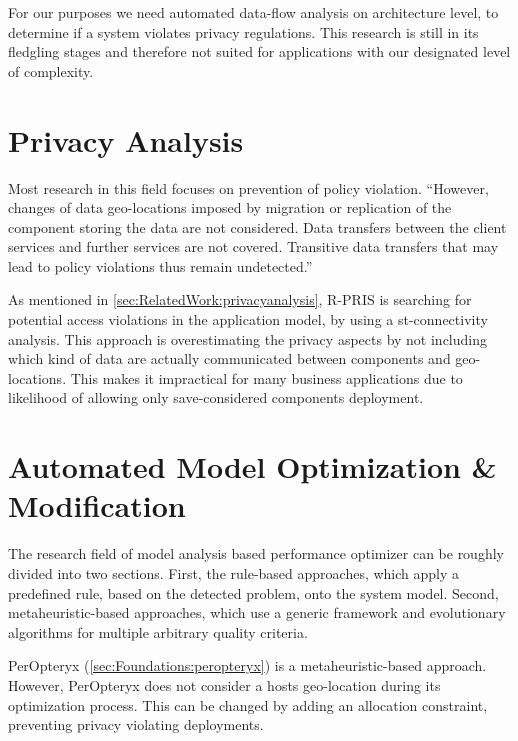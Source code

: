 For our purposes we need automated data-flow analysis on architecture level, to determine if a system violates privacy regulations. This research is still in its fledgling stages and therefore not suited for applications with our designated level of complexity.


\section{Privacy Analysis}
\label{sec:RelatedWork:privacy_check}

Most research in this field focuses on prevention of policy violation. “However, changes of data geo-locations imposed by migration or replication of the component storing the data are not considered. Data transfers between the client services and further services are not covered. Transitive data transfers that may lead to policy violations thus remain undetected.”\cite{Schmieders.2015}

As mentioned in \autoref{sec:RelatedWork:privacyanalysis}, R-PRIS is searching for potential access violations in the application model, by using a st-connectivity analysis.\cite{Schmieders.2015}\cite{Schmieders.} This approach is overestimating the privacy aspects by not including which kind of data are actually communicated between components and geo-locations. This makes it impractical for many business applications due to likelihood of allowing only save-considered components deployment.



\section{Automated Model Optimization \& Modification}
\label{sec:RelatedWork:auto_model_opt}

The research field of model analysis based performance optimizer can be roughly divided into two sections. First, the rule-based approaches, which apply a predefined rule, based on the detected problem, onto the system model. Second, metaheuristic-based approaches, which use a generic framework and evolutionary algorithms for multiple arbitrary quality criteria.\cite{Martens.2010}

PerOpteryx (\autoref{sec:Foundations:peropteryx}) is a metaheuristic-based approach. However, PerOpteryx does not consider a hosts geo-location during its optimization process. This can be changed by adding an allocation constraint, preventing privacy violating deployments. 



